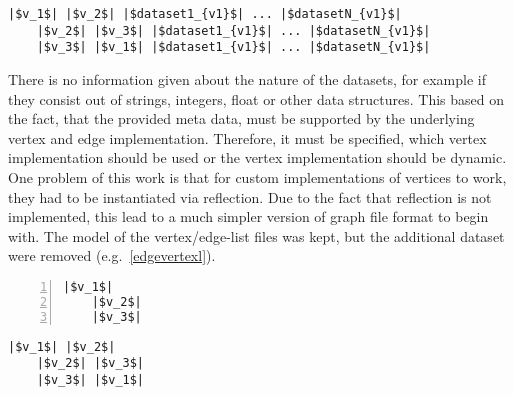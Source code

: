 \begin{minipage}{.48\textwidth}
	\begin{lstlisting}[numbers=none,caption={Edge File},captionpos=b, linewidth={\textwidth}, escapeinside=||,gobble = 4]
	|$v_1$| |$v_2$| |$dataset1_{v1}$| ... |$datasetN_{v1}$|
	|$v_2$| |$v_3$| |$dataset1_{v1}$| ... |$datasetN_{v1}$|
	|$v_3$| |$v_1$| |$dataset1_{v1}$| ... |$datasetN_{v1}$|
	\end{lstlisting}
\end{minipage}  
There is no information given about the nature of the datasets, for example if they consist out of strings, integers, float or other data structures. This based on the fact, that the provided meta data, must be supported by the underlying vertex and edge implementation. Therefore, it must be specified, which vertex implementation should be used or the vertex implementation should be dynamic.\\
One problem of this work is that for custom implementations of vertices to work, they had to be instantiated via reflection. Due to the fact that reflection is not implemented, this lead to a much simpler version of graph file format to begin with. The model of the vertex/edge-list files was kept, but the additional dataset were removed (e.g.~\ref{edgevertexl}).

\noindent\begin{minipage}{.48\textwidth}
	\begin{lstlisting}[numbers=left,
	stepnumber=1,showlines=true,caption={Vertex File},captionpos=b, linewidth={\textwidth}, escapeinside=||,gobble = 4, label=edgevertexl]
	|$v_1$|
	|$v_2$|
	|$v_3$|
	\end{lstlisting}
\end{minipage}\hfill
\begin{minipage}{.48\textwidth}
	\begin{lstlisting}[numbers=none,caption={Edge File},captionpos=b, linewidth={\textwidth}, escapeinside=||,gobble = 4]
	|$v_1$| |$v_2$|
	|$v_2$| |$v_3$|
	|$v_3$| |$v_1$|
	\end{lstlisting}
\end{minipage}  